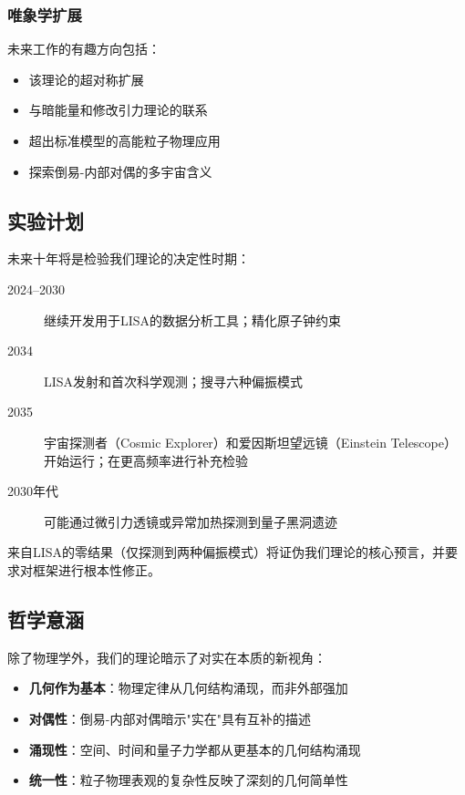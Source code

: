 \subsubsection{唯象学扩展}

未来工作的有趣方向包括：
\begin{itemize}
    \item 该理论的超对称扩展
    \item 与暗能量和修改引力理论的联系
    \item 超出标准模型的高能粒子物理应用
    \item 探索倒易-内部对偶的多宇宙含义
\end{itemize}

\subsection{实验计划}

未来十年将是检验我们理论的决定性时期：

\begin{description}
    \item[2024--2030] 继续开发用于LISA的数据分析工具；精化原子钟约束
    \item[2034] LISA发射和首次科学观测；搜寻六种偏振模式
    \item[2035] 宇宙探测者（Cosmic Explorer）和爱因斯坦望远镜（Einstein Telescope）开始运行；在更高频率进行补充检验
    \item[2030年代] 可能通过微引力透镜或异常加热探测到量子黑洞遗迹
\end{description}

来自LISA的零结果（仅探测到两种偏振模式）将证伪我们理论的核心预言，并要求对框架进行根本性修正。

\subsection{哲学意涵}

除了物理学外，我们的理论暗示了对实在本质的新视角：

\begin{itemize}
    \item \textbf{几何作为基本}：物理定律从几何结构涌现，而非外部强加
    \item \textbf{对偶性}：倒易-内部对偶暗示"实在"具有互补的描述
    \item \textbf{涌现性}：空间、时间和量子力学都从更基本的几何结构涌现
    \item \textbf{统一性}：粒子物理表观的复杂性反映了深刻的几何简单性
\end{itemize}

